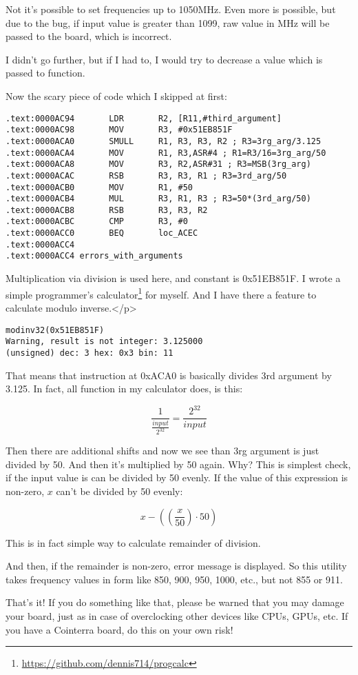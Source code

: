 Not it's possible to set frequencies up to 1050MHz. Even more is possible, but due to the bug, if input value is greater than 1099, raw value in MHz will be passed to the board, which is incorrect.

I didn't go further, but if I had to, I would try to decrease a value which is passed to  function.

Now the scary piece of code which I skipped at first:

\begin{lstlisting}
.text:0000AC94       LDR       R2, [R11,#third_argument]
.text:0000AC98       MOV       R3, #0x51EB851F
.text:0000ACA0       SMULL     R1, R3, R3, R2 ; R3=3rg_arg/3.125
.text:0000ACA4       MOV       R1, R3,ASR#4 ; R1=R3/16=3rg_arg/50
.text:0000ACA8       MOV       R3, R2,ASR#31 ; R3=MSB(3rg_arg)
.text:0000ACAC       RSB       R3, R3, R1 ; R3=3rd_arg/50
.text:0000ACB0       MOV       R1, #50
.text:0000ACB4       MUL       R3, R1, R3 ; R3=50*(3rd_arg/50)
.text:0000ACB8       RSB       R3, R3, R2
.text:0000ACBC       CMP       R3, #0
.text:0000ACC0       BEQ       loc_ACEC
.text:0000ACC4
.text:0000ACC4 errors_with_arguments
\end{lstlisting}

Multiplication via division is used here, and constant is 0x51EB851F.
I wrote a simple programmer's calculator\footnote{\url{https://github.com/dennis714/progcalc}} for myself.
And I have there a feature to calculate modulo inverse.</p>

\begin{lstlisting}
modinv32(0x51EB851F)
Warning, result is not integer: 3.125000
(unsigned) dec: 3 hex: 0x3 bin: 11
\end{lstlisting}

That means that  instruction at 0xACA0 is basically divides 3rd argument by 3.125.
In fact, all  function in my calculator does, is this:

\[
\frac{1}{\frac{input}{2^{32}}} = \frac{2^{32}}{input}
\]

Then there are additional shifts and now we see than 3rg argument is just divided by 50.
And then it's multiplied by 50 again.
Why?
This is simplest check, if the input value is can be divided by 50 evenly.
If the value of this expression is non-zero, $x$ can't be divided by 50 evenly:

\[
x-((\frac{x}{50}) \cdot 50)
\]

This is in fact simple way to calculate remainder of division.

And then, if the remainder is non-zero, error message is displayed. So this utility takes frequency values in form like 850, 900, 950, 1000, etc., but not 855 or 911.

That's it! If you do something like that, please be warned that you may damage your board, just as in case of overclocking other devices like CPUs, GPUs, etc.
If you have a Cointerra board, do this on your own risk!

